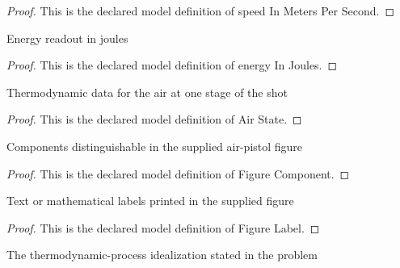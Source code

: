 \begin{proof}
  This is the declared model definition of speed In Meters Per Second.
\end{proof}
\begin{definition}
  \label{def:physics:phyx-mini-0461:phyxminiproblems-problemphyxmini0461-energyinjoules}
  Energy readout in joules
\end{definition}
\begin{proof}
  This is the declared model definition of energy In Joules.
\end{proof}
\begin{definition}
  \label{def:physics:phyx-mini-0461:phyxminiproblems-problemphyxmini0461-airstate}
  Thermodynamic data for the air at one stage of the shot
\end{definition}
\begin{proof}
  This is the declared model definition of Air State.
\end{proof}
\begin{definition}
  \label{def:physics:phyx-mini-0461:phyxminiproblems-problemphyxmini0461-figurecomponent}
  Components distinguishable in the supplied air-pistol figure
\end{definition}
\begin{proof}
  This is the declared model definition of Figure Component.
\end{proof}
\begin{definition}
  \label{def:physics:phyx-mini-0461:phyxminiproblems-problemphyxmini0461-figurelabel}
  Text or mathematical labels printed in the supplied figure
\end{definition}
\begin{proof}
  This is the declared model definition of Figure Label.
\end{proof}
\begin{definition}
  \label{def:physics:phyx-mini-0461:phyxminiproblems-problemphyxmini0461-thermodynamicprocess}
  The thermodynamic-process idealization stated in the problem
\end{definition}
